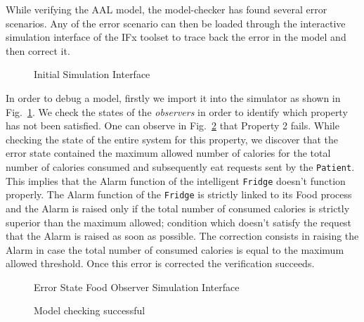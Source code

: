 \documentclass[a4paper,twoside]{article}
\begin{document}
While verifying the AAL model, the model-checker has found several error scenarios. 
Any of the error scenario can then be loaded through the interactive simulation interface of the IFx toolset to trace back the error in the model and then correct it. 
%
%
\begin{figure}[!h]
  \centering
  {}
  \caption{Initial Simulation Interface}
  \label{fig:initialsimulationinterface}
 \end{figure}
%
In order to  debug  a model, firstly we import it into the simulator as shown in Fig.~\ref{fig:initialsimulationinterface}. We check the states of the \textit{observers} in order to identify which property has not been satisfied. One can observe in Fig.~\ref{fig:errorstatefoodobserver} that Property 2 fails. While checking the state of the entire system for this property, we discover that the error state contained the maximum allowed number of calories for the total number of calories consumed and subsequently eat requests sent by the \texttt{Patient}. This implies that the Alarm function of the intelligent \texttt{Fridge} doesn't function properly. The Alarm function of the \texttt{Fridge} is strictly linked to its Food process and the Alarm is raised only if the total number of consumed calories is strictly superior than the maximum allowed; condition which doesn't satisfy the request that the Alarm is raised as soon as possible. The correction consists in raising the Alarm in case the total number of consumed calories is equal to the maximum allowed threshold. Once this error is corrected the verification succeeds.


\begin{figure}[!h]
  \centering
  {}
  \caption{Error State Food Observer Simulation Interface}
  \label{fig:errorstatefoodobserver}
 \end{figure}

\begin{figure}[!h]
  \centering
  {}
  \caption{Model checking successful}
  \label{fig:verificationok}
 \end{figure} 
\end{document}
